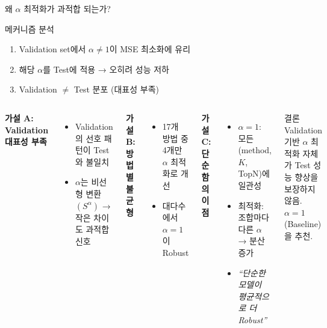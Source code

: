 \documentclass[aspectratio=169, 10pt]{beamer}
\begin{document}
\begin{frame}[shrink=5]{왜 $\alpha$ 최적화가 과적합 되는가?}

  \begin{block}{메커니즘 분석}
    \begin{enumerate}
      \item Validation set에서 $\alpha \neq 1$이 MSE 최소화에 유리
      \item 해당 $\alpha$를 Test에 적용 → 오히려 성능 저하
      \item Validation $\neq$ Test 분포 (대표성 부족)
    \end{enumerate}
  \end{block}

  \vspace{0.3em}
  \begin{columns}[T]
      \textbf{가설 A: Validation 대표성 부족}
      \begin{itemize}
        \item Validation의 선호 패턴이 Test와 불일치
        \item $\alpha$는 비선형 변환 $(S^\alpha)$ → 작은 차이도 과적합 신호
      \end{itemize}
      \vspace{0.4em}
      \textbf{가설 B: 방법별 불균형}
      \begin{itemize}
        \item 17개 방법 중 4개만 $\alpha$ 최적화로 개선
        \item 대다수에서 $\alpha=1$이 Robust
      \end{itemize}

      \textbf{가설 C: 단순함의 이점}
      \begin{itemize}
        \item $\alpha=1$: 모든 (method, $K$, TopN)에 일관성
        \item 최적화: 조합마다 다른 $\alpha$ → 분산 증가
        \item \textit{``단순한 모델이 평균적으로 더 Robust''}
      \end{itemize}
      \vspace{0.4em}
      \begin{exampleblock}{결론}
        Validation 기반 $\alpha$ 최적화 자체가
        Test 성능 향상을 보장하지 않음.
        $\alpha = 1$ (Baseline)을 추천.
      \end{exampleblock}
  \end{columns}
\end{frame}
\end{document}
